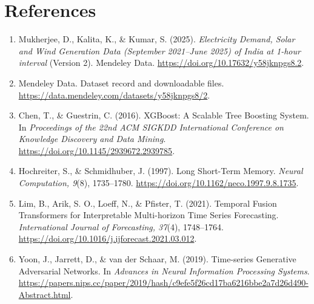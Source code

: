 \documentclass[12pt,a4paper]{article}
\begin{document}
\section{References}
\begin{enumerate}[leftmargin=*]
  \item Mukherjee, D., Kalita, K., \& Kumar, S. (2025). \textit{Electricity Demand, Solar and Wind Generation Data (September 2021--June 2025) of India at 1-hour interval} (Version 2). Mendeley Data. \url{https://doi.org/10.17632/y58jknpgs8.2}.
  \item Mendeley Data. Dataset record and downloadable files. \url{https://data.mendeley.com/datasets/y58jknpgs8/2}.
  \item Chen, T., \& Guestrin, C. (2016). XGBoost: A Scalable Tree Boosting System. In \textit{Proceedings of the 22nd ACM SIGKDD International Conference on Knowledge Discovery and Data Mining}. \url{https://doi.org/10.1145/2939672.2939785}.
  \item Hochreiter, S., \& Schmidhuber, J. (1997). Long Short-Term Memory. \textit{Neural Computation, 9}(8), 1735--1780. \url{https://doi.org/10.1162/neco.1997.9.8.1735}.
  \item Lim, B., Arik, S. O., Loeff, N., \& Pfister, T. (2021). Temporal Fusion Transformers for Interpretable Multi-horizon Time Series Forecasting. \textit{International Journal of Forecasting, 37}(4), 1748--1764. \url{https://doi.org/10.1016/j.ijforecast.2021.03.012}.
  \item Yoon, J., Jarrett, D., \& van der Schaar, M. (2019). Time-series Generative Adversarial Networks. In \textit{Advances in Neural Information Processing Systems}. \url{https://papers.nips.cc/paper/2019/hash/c9efe5f26cd17ba6216bbe2a7d26d490-Abstract.html}.
\end{enumerate}
\end{document}
